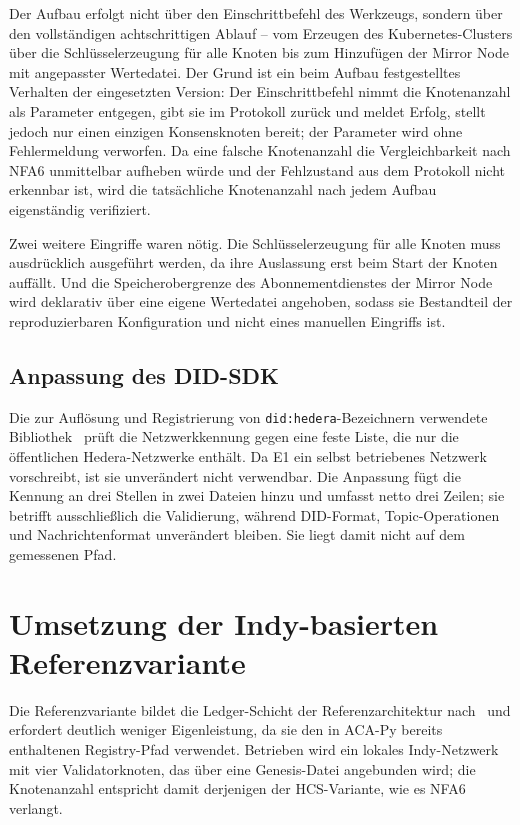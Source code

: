 Der Aufbau erfolgt nicht über den Einschrittbefehl des Werkzeugs, sondern über den vollständigen achtschrittigen Ablauf -- vom Erzeugen des Kubernetes-Clusters über die Schlüsselerzeugung für alle Knoten bis zum Hinzufügen der Mirror Node mit angepasster Wertedatei. Der Grund ist ein beim Aufbau festgestelltes Verhalten der eingesetzten Version: Der Einschrittbefehl nimmt die Knotenanzahl als Parameter entgegen, gibt sie im Protokoll zurück und meldet Erfolg, stellt jedoch nur einen einzigen Konsensknoten bereit; der Parameter wird ohne Fehlermeldung verworfen. Da eine falsche Knotenanzahl die Vergleichbarkeit nach NFA6 unmittelbar aufheben würde und der Fehlzustand aus dem Protokoll nicht erkennbar ist, wird die tatsächliche Knotenanzahl nach jedem Aufbau eigenständig verifiziert.

Zwei weitere Eingriffe waren nötig. Die Schlüsselerzeugung für alle Knoten muss ausdrücklich ausgeführt werden, da ihre Auslassung erst beim Start der Knoten auffällt. Und die Speicherobergrenze des Abonnementdienstes der Mirror Node wird deklarativ über eine eigene Wertedatei angehoben, sodass sie Bestandteil der reproduzierbaren Konfiguration und nicht eines manuellen Eingriffs ist.

\subsection{Anpassung des DID-SDK}
\label{subsec:impl-hcs-patch}

Die zur Auflösung und Registrierung von \texttt{did:hedera}-Bezeichnern verwendete Bibliothek~\cite{hierodidsdk} prüft die Netzwerkkennung gegen eine feste Liste, die nur die öffentlichen Hedera-Netzwerke enthält. Da E1 ein selbst betriebenes Netzwerk vorschreibt, ist sie unverändert nicht verwendbar. Die Anpassung fügt die Kennung an drei Stellen in zwei Dateien hinzu und umfasst netto drei Zeilen; sie betrifft ausschließlich die Validierung, während DID-Format, Topic-Operationen und Nachrichtenformat unverändert bleiben. Sie liegt damit nicht auf dem gemessenen Pfad.

\section{Umsetzung der Indy-basierten Referenzvariante}
\label{sec:impl-indy}

Die Referenzvariante bildet die Ledger-Schicht der Referenzarchitektur nach~\cite{erler2023} und erfordert deutlich weniger Eigenleistung, da sie den in ACA-Py bereits enthaltenen Registry-Pfad verwendet. Betrieben wird ein lokales Indy-Netzwerk mit vier Validatorknoten, das über eine Genesis-Datei angebunden wird; die Knotenanzahl entspricht damit derjenigen der HCS-Variante, wie es NFA6 verlangt.

